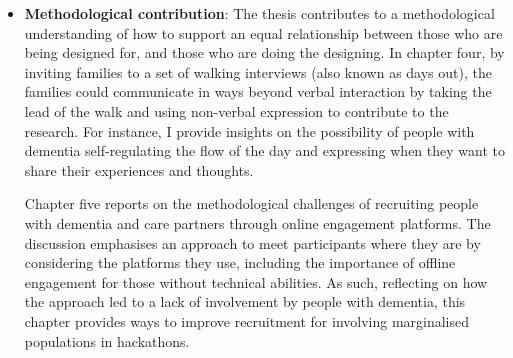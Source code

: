 \begin{itemize}
    
    \item \textbf{Methodological contribution}:  The thesis contributes to a methodological understanding of how to support an equal relationship between those who are being designed for, and those who are doing the designing. In chapter four, by inviting families to a set of walking interviews (also known as days out), the families could communicate in ways beyond verbal interaction by taking the lead of the walk and using non-verbal expression to contribute to the research. For instance, I provide insights on the possibility of people with dementia self-regulating the flow of the day and expressing when they want to share their experiences and thoughts.

    Chapter five reports on the methodological challenges of recruiting people with dementia and care partners through online engagement platforms. The discussion emphasises an approach to meet participants where they are by considering the platforms they use, including the importance of offline engagement for those without technical abilities. As such, reflecting on how the approach led to a lack of involvement by people with dementia, this chapter provides ways to improve recruitment for involving marginalised populations in hackathons.
\end{itemize}
